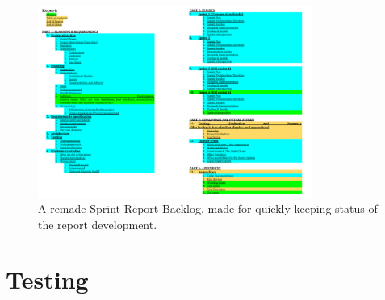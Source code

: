 \begin{figure}[ht!]
\centering
\includegraphics[width=90mm]{./FinalSprint/img/ReportBacklog.png}
\caption{A remade Sprint Report Backlog, made for quickly keeping status of the report development. \label{fig:FinalReportBacklog}}
\end{figure}

\section{Testing}
\label{sec:FinalTesting}


